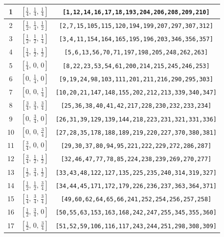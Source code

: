 \documentclass[fleqn,8pt]{jsarticle}
\begin{document}
\begin{longtable}{ccc}
1 & $\left[ \frac{1}{4},\, \frac{1}{4},\, \frac{1}{4} \right]$ & {\tt [1,12,14,16,17,18,193,204,206,208,209,210]} \\ \hline
2 & $\left[ \frac{1}{2},\, \frac{1}{4},\, \frac{1}{2} \right]$ & {\tt [2,7,15,105,115,120,194,199,207,297,307,312]} \\ \hline
3 & $\left[ \frac{1}{2},\, \frac{1}{2},\, \frac{1}{4} \right]$ & {\tt [3,4,11,154,164,165,195,196,203,346,356,357]} \\ \hline
4 & $\left[ \frac{1}{4},\, \frac{1}{2},\, \frac{1}{2} \right]$ & {\tt [5,6,13,56,70,71,197,198,205,248,262,263]} \\ \hline
5 & $\left[ \frac{1}{4},\, 0,\, 0 \right]$ & {\tt [8,22,23,53,54,61,200,214,215,245,246,253]} \\ \hline
6 & $\left[ 0,\, \frac{1}{4},\, 0 \right]$ & {\tt [9,19,24,98,103,111,201,211,216,290,295,303]} \\ \hline
7 & $\left[ 0,\, 0,\, \frac{1}{4} \right]$ & {\tt [10,20,21,147,148,155,202,212,213,339,340,347]} \\ \hline
8 & $\left[ \frac{3}{4},\, \frac{3}{4},\, \frac{3}{4} \right]$ & {\tt [25,36,38,40,41,42,217,228,230,232,233,234]} \\ \hline
9 & $\left[ 0,\, \frac{3}{4},\, 0 \right]$ & {\tt [26,31,39,129,139,144,218,223,231,321,331,336]} \\ \hline
10 & $\left[ 0,\, 0,\, \frac{3}{4} \right]$ & {\tt [27,28,35,178,188,189,219,220,227,370,380,381]} \\ \hline
11 & $\left[ \frac{3}{4},\, 0,\, 0 \right]$ & {\tt [29,30,37,80,94,95,221,222,229,272,286,287]} \\ \hline
12 & $\left[ \frac{3}{4},\, \frac{1}{2},\, \frac{1}{2} \right]$ & {\tt [32,46,47,77,78,85,224,238,239,269,270,277]} \\ \hline
13 & $\left[ \frac{1}{2},\, \frac{3}{4},\, \frac{1}{2} \right]$ & {\tt [33,43,48,122,127,135,225,235,240,314,319,327]} \\ \hline
14 & $\left[ \frac{1}{2},\, \frac{1}{2},\, \frac{3}{4} \right]$ & {\tt [34,44,45,171,172,179,226,236,237,363,364,371]} \\ \hline
15 & $\left[ \frac{1}{4},\, \frac{3}{4},\, \frac{3}{4} \right]$ & {\tt [49,60,62,64,65,66,241,252,254,256,257,258]} \\ \hline
16 & $\left[ \frac{1}{2},\, \frac{3}{4},\, 0 \right]$ & {\tt [50,55,63,153,163,168,242,247,255,345,355,360]} \\ \hline
17 & $\left[ \frac{1}{2},\, 0,\, \frac{3}{4} \right]$ & {\tt [51,52,59,106,116,117,243,244,251,298,308,309]} \\ \hline

\end{longtable}
\end{document}
